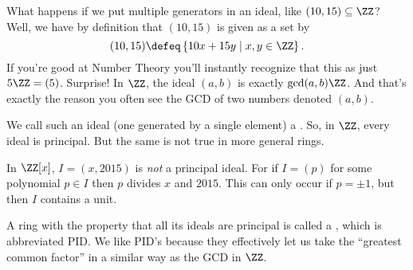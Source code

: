 What happens if we put multiple generators in an ideal, like $(10,15) \subseteq \ZZ$?
Well, we have by definition that $(10,15)$ is given as a set by
\[ 
	(10,15) \defeq \left\{ 10x + 15y \mid x,y \in \ZZ \right\}.
\]
If you're good at Number Theory you'll instantly recognize that this as just $5\ZZ = (5)$.
Surprise! In $\ZZ$, the ideal $(a,b)$ is exactly $\gcd(a,b) \ZZ$.
And that's exactly the reason you often see the GCD of two numbers denoted $(a,b)$.

We call such an ideal (one generated by a single element) a .
So, in $\ZZ$, every ideal is principal.
But the same is not true in more general rings.
\begin{example}
	In $\ZZ[x]$, $I = (x,2015)$ is \emph{not} a principal ideal.
	For if $I = (p)$ for some polynomial $p \in I$
	then $p$ divides $x$ and $2015$.
	This can only occur if $p = \pm 1$,
	but then $I$ contains a unit.
\end{example}
A ring with the property that all its ideals are principal is called a ,
which is abbreviated PID.
We like PID's because they effectively let us take the ``greatest common factor''
in a similar way as the GCD in $\ZZ$.

